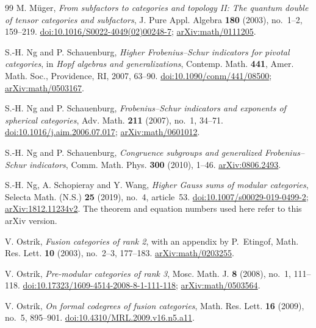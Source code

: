 \documentclass[11pt,a4paper]{article}
\numberwithin{equation}{section}
\begin{document}
\begin{thebibliography}{99}
 M. M\"uger,
\emph{From subfactors to categories and topology II:
The quantum double of tensor categories and subfactors},
J. Pure Appl. Algebra \textbf{180} (2003), no.~1--2, 159--219.
\href{https://doi.org/10.1016/S0022-4049(02)00248-7}{doi:10.1016/S0022-4049(02)00248-7};
\href{https://arxiv.org/abs/math/0111205}{arXiv:math/0111205}.

 S.-H. Ng and P. Schauenburg,
\emph{Higher Frobenius--Schur indicators for pivotal categories},
in \emph{Hopf algebras and generalizations},
Contemp. Math. \textbf{441}, Amer. Math. Soc., Providence, RI,
2007, 63--90.
\href{https://doi.org/10.1090/conm/441/08500}{doi:10.1090/conm/441/08500};
\href{https://arxiv.org/abs/math/0503167}{arXiv:math/0503167}.

 S.-H. Ng and P. Schauenburg,
\emph{Frobenius--Schur indicators and exponents of spherical categories},
Adv. Math. \textbf{211} (2007), no.~1, 34--71.
\href{https://doi.org/10.1016/j.aim.2006.07.017}{doi:10.1016/j.aim.2006.07.017};
\href{https://arxiv.org/abs/math/0601012}{arXiv:math/0601012}.

 S.-H. Ng and P. Schauenburg, \emph{Congruence subgroups and generalized Frobenius--Schur indicators}, Comm. Math. Phys. \textbf{300} (2010), 1--46. \href{https://arxiv.org/abs/0806.2493}{arXiv:0806.2493}.

 S.-H. Ng, A. Schopieray and Y. Wang,
\emph{Higher Gauss sums of modular categories}, Selecta Math. (N.S.)
\textbf{25} (2019), no.~4, article~53.
\href{https://doi.org/10.1007/s00029-019-0499-2}{doi:10.1007/s00029-019-0499-2};
\href{https://arxiv.org/abs/1812.11234v2}{arXiv:1812.11234v2}.
The theorem and equation numbers used here refer to this arXiv version.

V. Ostrik, \emph{Fusion categories of rank 2}, with an appendix by P.~Etingof,
Math. Res. Lett. \textbf{10} (2003), no.~2--3, 177--183.
\href{https://arxiv.org/abs/math/0203255}{arXiv:math/0203255}.

 V. Ostrik,
\emph{Pre-modular categories of rank 3},
Mosc. Math. J. \textbf{8} (2008), no.~1, 111--118.
\href{https://doi.org/10.17323/1609-4514-2008-8-1-111-118}{doi:10.17323/1609-4514-2008-8-1-111-118};
\href{https://arxiv.org/abs/math/0503564}{arXiv:math/0503564}.

V. Ostrik, \emph{On formal codegrees of fusion categories},
Math. Res. Lett. \textbf{16} (2009), no.~5, 895--901.
\href{https://doi.org/10.4310/MRL.2009.v16.n5.a11}{doi:10.4310/MRL.2009.v16.n5.a11}.


\end{thebibliography}
\end{document}
